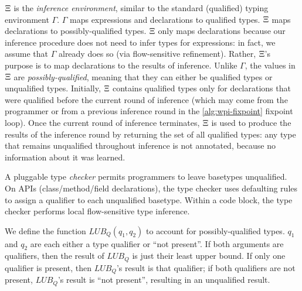 $\Xi$ is the \emph{inference environment}, similar to the standard (qualified)
typing environment $\Gamma$. $\Gamma$ maps expressions and declarations to qualified types.
$\Xi$ maps declarations to possibly-qualified types.
$\Xi$ only maps declarations because our inference procedure does not need to infer
types for expressions: in fact, we assume that $\Gamma$ already does so (via flow-sensitive
refinement). Rather, $\Xi$'s purpose is to map declarations to the results of inference.
Unlike $\Gamma$, the values in $\Xi$ are \emph{possibly-qualified}, meaning that they can either
be qualified types or unqualified types. Initially, $\Xi$ contains qualified types only
for declarations that were qualified before the current round of inference (which may come from
the programmer or from a previous inference round in the \cref{alg:wpi-fixpoint} fixpoint loop).
Once the current round of inference terminates, $\Xi$ is used to produce the results of the
inference round by returning the set of all qualified types: any type that remains unqualified
throughout inference is not annotated, because no information about it was learned.

A pluggable type \emph{checker} permits programmers to leave basetypes unqualified.
On APIs (class/method/field declarations), the type checker uses defaulting
rules to assign a qualifier to each unqualified basetype.
Within a code block, the type checker performs local flow-sensitive type
inference.


We define the function $\mathit{LUB_Q}(q_1, q_2)$ to account for possibly-qualified types.
$q_1$ and $q_2$ are each either a type qualifier or ``not present''.
If both arguments are qualifiers, then the result of $\mathit{LUB_Q}$
is just their least upper bound. If only one qualifier is present, then $\mathit{LUB_Q}$'s result
is that qualifier; if both qualifiers are not present, $\mathit{LUB_Q}$'s result is ``not present'',
resulting in an unqualified result.







